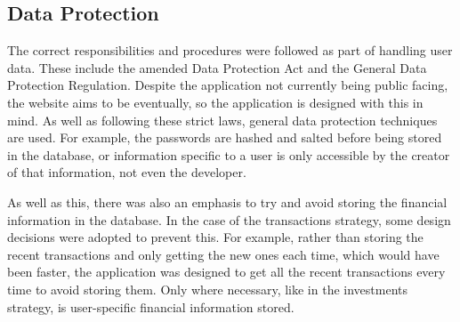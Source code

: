 \subsection{Data Protection}
The correct responsibilities and procedures were followed as part of handling user data. These include the amended Data Protection Act and the General Data Protection Regulation. Despite the application not currently being public facing, the website aims to be eventually, so the application is designed with this in mind. As well as following these strict laws, general data protection techniques are used. For example, the passwords are hashed and salted before being stored in the database, or information specific to a user is only accessible by the creator of that information, not even the developer.

As well as this, there was also an emphasis to try and avoid storing the financial information in the database. In the case of the transactions strategy, some design decisions were adopted to prevent this. For example, rather than storing the recent transactions and only getting the new ones each time, which would have been faster, the application was designed to get all the recent transactions every time to avoid storing them. Only where necessary, like in the investments strategy, is user-specific financial information stored.
